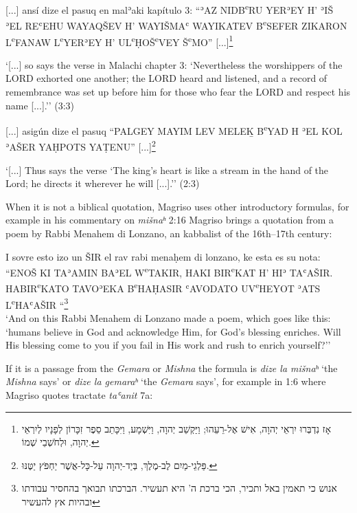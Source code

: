 \documentclass[output=paper,colorlinks,citecolor=brown,babel,arabicfont]{langscibook}
\begin{document}
\ea\label{ch3.7.ex.n8}
{[...]} ansí dize el pasuq en malʾaki kapítulo 3: ``ʾAZ NIDB\textsuperscript{e}RU YERʾEY H' ʾIŠ ʾEL REʿEHU WAYAQŠEV H' WAYIŠMAʿ WAYIKATEV B\textsuperscript{e}SEFER ZIKARON L\textsuperscript{e}FANAW L\textsuperscript{e}YERʾEY H' UL\textsuperscript{e}ḤOŠ\textsuperscript{e}VEY Š\textsuperscript{e}MO'' {[...]}\footnote{\texthebrew{אָז נִדְבְּרוּ יִרְאֵי יְהוָה, אִישׁ אֶל-רֵעֵהוּ; וַיַּקְשֵׁב יְהוָה, וַיִּשְׁמָע, וַיִּכָּתֵב סֵפֶר זִכָּרוֹן לְפָנָיו לְיִרְאֵי יְהוָה, וּלְחֹשְׁבֵי שְׁמוֹ.}}

`{[...]} so says the verse in Malachi chapter 3: `Nevertheless the worshippers of the LORD exhorted one another; the LORD heard and listened, and a record of remembrance was set up before him for those who fear the LORD and respect his name {[...]}.'' (3:3)
\z

\ea\label{ch3.7.ex.n9}
{[...]} asigún dize el pasuq ``PALGEY MAYIM LEV MELE\b{K} B\textsuperscript{e}YAD H ʾEL KOL ʾAŠER YAḤPOTS YAṬENU'' {[...]}\footnote{\texthebrew{פַּלְגֵי-מַיִם לֶב-מֶלֶךְ, בְּיַד-יְהוָה עַל-כָּל-אֲשֶׁר יַחְפֹּץ יַטֶּנּוּ.}}

`{[...]} Thus says the verse `The king's heart is like a stream in the hand of the Lord; he directs it wherever he will {[...]}.'' (2:3)
\z

When it is not a biblical quotation, Magriso uses other introductory formulas, for example in his commentary on \textit{mišnaʰ} 2:16 Magriso brings a quotation from a poem by Rabbi Menahem di Lonzano, an  kabbalist of the 16th--17th century: 

\ea\label{ch3.7.ex.n10}
I sovre esto izo un ŠIR el rav rabi menaḥem di lonzano, ke esta es su nota: \\
``ENOŠ KI TAʾAMIN BAʾEL W\textsuperscript{e}TAKIR, HAKI BIR\textsuperscript{e}KAT H' HIʾ TAʿAŠIR. HABIR\textsuperscript{e}KATO TAVOʾEKA B\textsuperscript{e}HAḤASIR ʿAVODATO UV\textsuperscript{e}HEYOT ʾATS L\textsuperscript{e}HAʿAŠIR ``\footnote{\texthebrew{אנוש כי תאמין באל ותכיר, הכי ברכת ה' היא תעשיר. הברכתו תבואך בהחסיר עבודתו ובהיות אץ להעשיר}} \\
`And on this Rabbi Menahem di Lonzano made a poem, which goes like this: `humans believe in God and acknowledge Him, for God's blessing enriches. Will His blessing come to you if you fail in His work and rush to enrich yourself?''
\z

If it is a passage from the \textit{Gemara} or \textit{Mishna} the formula is \textit{dize la mišnaʰ} `the \textit{Mishna} says' or \textit{dize la gemaraʰ} `the \textit{Gemara} says', for example in 1:6 where Magriso quotes tractate \textit{taʿanit} 7a:
\end{document}
